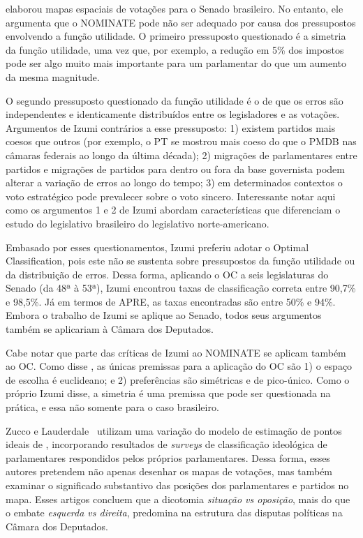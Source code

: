 \documentclass[
	article,			%
	12pt,				%
    twoside,			%
	a4paper,			%
	english,			%
	french,				%
	spanish,			%
	brazil,				%
	]{abntex2}
\newcommand\nominate{NOMINATE\xspace}
\begin{document}
 elaborou mapas espaciais de votações para o Senado brasileiro. No entanto, ele argumenta que o \nominate pode não ser adequado por causa dos pressupostos envolvendo a função utilidade. O primeiro pressuposto questionado é a simetria da função utilidade, uma vez que, por exemplo, a redução em 5\% dos impostos pode ser algo muito mais importante para um parlamentar do que um aumento da mesma magnitude.

O segundo pressuposto questionado da função utilidade é o de que os erros são independentes e identicamente distribuídos entre os legisladores e as votações. Argumentos de Izumi contrários a esse pressuposto: 1) existem partidos mais coesos que outros (por exemplo, o PT se mostrou mais coeso do que o PMDB nas câmaras federais ao longo da última década); 2) migrações de parlamentares entre partidos e migrações de partidos para dentro ou fora da base governista podem alterar a variação de erros ao longo do tempo;  3) em determinados contextos o voto estratégico pode prevalecer sobre o voto sincero. Interessante notar aqui como os argumentos 1 e 2 de Izumi abordam características que diferenciam o estudo do legislativo brasileiro do legislativo norte-americano.

Embasado por esses questionamentos, Izumi preferiu adotar o Optimal Classification, pois este não se sustenta sobre pressupostos da função utilidade ou da distribuição de erros. Dessa forma, aplicando o OC a seis legislaturas do Senado (da 48ª à 53ª), Izumi encontrou taxas de classificação correta entre 90,7\% e 98,5\%. Já em termos de APRE, as taxas encontradas são entre 50\% e 94\%. Embora o trabalho de Izumi se aplique ao Senado, todos seus argumentos também se aplicariam à Câmara dos Deputados.

Cabe notar que parte das críticas de Izumi ao \nominate se aplicam também ao OC. Como disse , as únicas premissas para a aplicação do OC são 1) o espaço de escolha é euclideano; e 2) preferências são simétricas e de pico-único. Como o próprio Izumi disse, a simetria é uma premissa que pode ser questionada na prática, e essa não somente para o caso brasileiro.

Zucco e Lauderdale~\cite{zucco2011ideologia, zucco2011distinguishing} utilizam uma variação do modelo de estimação de pontos ideais de , incorporando resultados de \emph{surveys} de classificação ideológica de parlamentares respondidos pelos próprios parlamentares. Dessa forma, esses autores pretendem não apenas desenhar os mapas de votações, mas também examinar o significado substantivo das posições dos parlamentares e partidos no mapa. Esses artigos concluem que a dicotomia \emph{situação vs oposição}, mais do que o embate \emph{esquerda vs direita}, predomina na estrutura das disputas políticas na Câmara dos Deputados.
\end{document}
